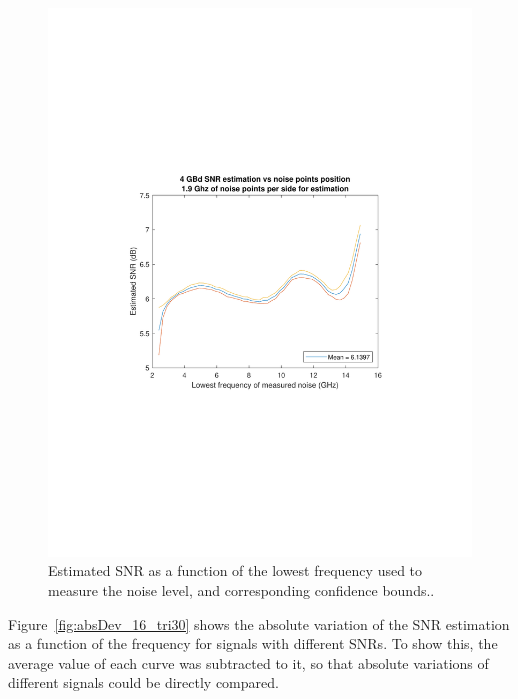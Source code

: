 \begin{refsection}
\begin{figure}[H]
\begin{minipage}{0.43\textwidth}
		\includegraphics[clip, trim=4cm 8cm 4cm 8cm, 
		width=1\textwidth]{./sdf/m_qam_system/figures/snr/curveAndConf/4GBdSNRcurve.pdf}
		\subcaption{\label{fig:snrVsFreq_16_10_2500}}
	\end{minipage}
	\caption{Estimated SNR as a function of the lowest frequency used to measure the noise level, and corresponding confidence bounds..\label{fig:snrvsFreq_16_10}}
\end{figure}

Figure~\ref{fig:absDev_16_tri30} shows the absolute variation of the SNR estimation as a function of the frequency for signals with different SNRs. To show this, the average value of each curve was subtracted to it, so that absolute variations of different signals could be directly compared.


\end{refsection}
